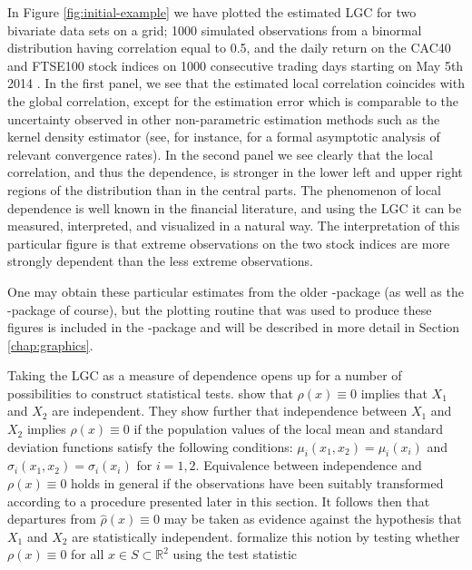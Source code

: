 In Figure \ref{fig:initial-example} we have plotted the estimated LGC for two bivariate data sets on a grid; 1000 simulated observations from a binormal distribution having correlation equal to 0.5, and the daily return on the CAC40 and FTSE100 stock indices on 1000 consecutive trading days starting on May 5th 2014 \citep{datastream}. In the first panel, we see that the estimated local correlation coincides with the global correlation, except for the estimation error which is comparable to the uncertainty observed in other non-parametric estimation methods such as the kernel density estimator (see, for instance, \cite{otne:tjos:2017} for a formal asymptotic analysis of relevant convergence rates). In the second panel we see clearly that the local correlation, and thus the dependence, is stronger in the lower left and upper right regions of the distribution than in the central parts. The phenomenon of local dependence is well known in the financial literature, and using the LGC it can be measured, interpreted, and visualized in a natural way. The interpretation of this particular figure is that extreme observations on the two stock indices are more strongly dependent than the less extreme observations. 

One may obtain these particular estimates from the older -package (as well as the -package of course), but the plotting routine that was used to produce these figures is included in the -package and will be described in more detail in Section \ref{chap:graphics}.

Taking the LGC as a measure of dependence opens up for a number of possibilities to construct statistical tests. \cite{bere:tjos:2014} show that $\rho\left(x\right) \equiv 0$ implies that $X_1$ and $X_2$ are independent. They show further that independence between $X_1$ and $X_2$ implies $\rho\left(x\right) \equiv 0$ if the population values of the local mean and standard deviation functions satisfy the following conditions: $\mu_i\left(x_1, x_2\right) = \mu_i\left(x_i\right)$ and $\sigma_i\left(x_1, x_2\right) = \sigma_i\left(x_i\right)$ for $i=1,2$. Equivalence between independence and $\rho\left(x\right) \equiv 0$ holds in general if the observations have been suitably transformed according to a procedure presented later in this section. It follows then that departures from $\widehat\rho\left(x\right) \equiv 0$ may be taken as evidence against the hypothesis that $X_1$ and $X_2$ are statistically independent. \cite{bere:tjos:2014} formalize this notion by testing whether $\rho\left(x\right) \equiv 0$ for all $x\in S \subset \mathbb{R}^2$ using the test statistic

